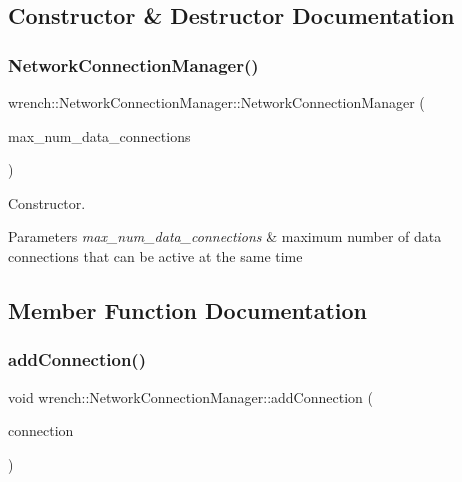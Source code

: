 \subsection{Constructor \& Destructor Documentation}
\mbox{\label{classwrench_1_1_network_connection_manager_afd93226fb4d7ab8949fe8319039c0038}} 
\subsubsection{\texorpdfstring{Network\+Connection\+Manager()}{NetworkConnectionManager()}}
{\footnotesize\ttfamily wrench\+::\+Network\+Connection\+Manager\+::\+Network\+Connection\+Manager (\begin{DoxyParamCaption}\item[{unsigned long}]{max\+\_\+num\+\_\+data\+\_\+connections }\end{DoxyParamCaption})}



Constructor. 


\begin{DoxyParams}{Parameters}
{\em max\+\_\+num\+\_\+data\+\_\+connections} & maximum number of data connections that can be active at the same time \\
\hline
\end{DoxyParams}


\subsection{Member Function Documentation}
\mbox{\label{classwrench_1_1_network_connection_manager_afc8f9783ff5876f8fc98c2ab23734c6d}} 
\subsubsection{\texorpdfstring{add\+Connection()}{addConnection()}}
{\footnotesize\ttfamily void wrench\+::\+Network\+Connection\+Manager\+::add\+Connection (\begin{DoxyParamCaption}\item[{std\+::unique\+\_\+ptr$<$ \hyperlink{classwrench_1_1_network_connection}{Network\+Connection} $>$}]{connection }\end{DoxyParamCaption})}



